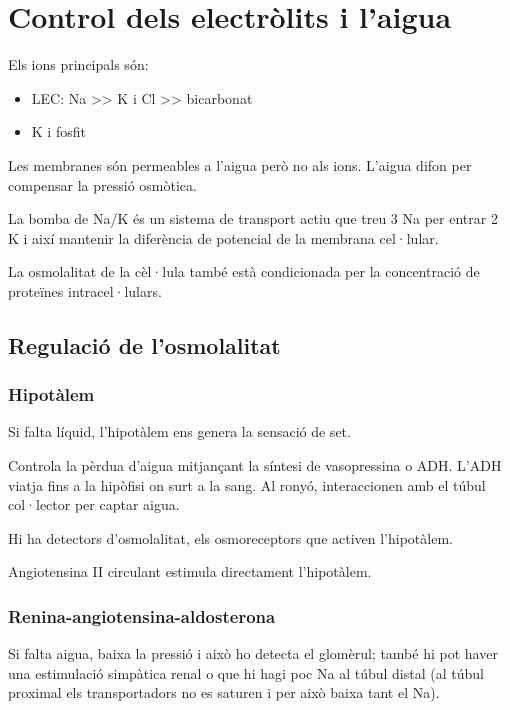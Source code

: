 
\section{Control dels electròlits i l'aigua}
\label{sec:contr-dels-electr}


Els ions principals són:
\begin{itemize}
\item LEC: Na >> K i Cl >> bicarbonat
\item K i fosfit
\end{itemize}

Les membranes són permeables a l'aigua però no als ions. L'aigua difon
per compensar la pressió osmòtica.

La bomba de Na/K és un sistema de transport actiu que treu 3 Na per
entrar 2 K i així mantenir la diferència de potencial de la membrana
cel·lular.


La osmolalitat de la cèl·lula també està condicionada per la
concentració de proteïnes intracel·lulars.

\subsection{Regulació de l'osmolalitat}
\label{sec:regul-de-losm}

\subsubsection{Hipotàlem}
\label{sec:hipotalem}
Si falta líquid, l'hipotàlem ens genera la sensació de set. 

Controla la pèrdua d'aigua mitjançant la síntesi de vasopressina o
ADH. L'ADH viatja fins a la hipòfisi on surt a la sang. Al ronyó,
interaccionen amb el túbul col·lector per captar aigua.

Hi ha detectors d'osmolalitat, els osmoreceptors que activen
l'hipotàlem. 

Angiotensina II circulant estimula directament l'hipotàlem.

\subsubsection{Renina-angiotensina-aldosterona}
\label{sec:renina-angi-aldost}
Si falta aigua, baixa la pressió i això ho detecta el glomèrul; també
hi pot haver una estimulació simpàtica renal o que hi hagi poc Na al
túbul distal (al túbul proximal els transportadors no es saturen i per
això baixa tant el Na).

